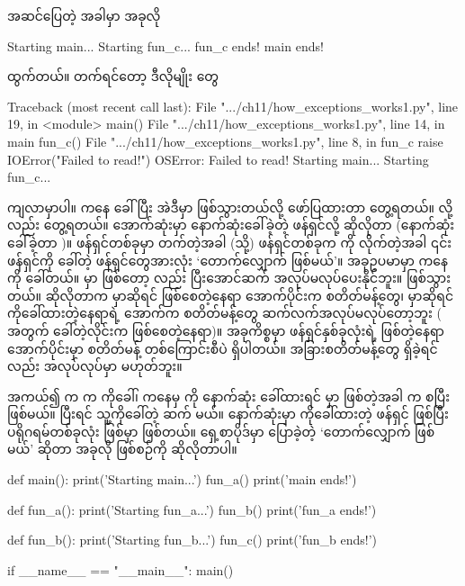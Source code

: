 အဆင်ပြေတဲ့ အခါမှာ အခုလို
\begin{codetxt}
Starting main...
Starting fun_c...
fun_c ends!
main ends!
\end{codetxt}
ထွက်တယ်။  တက်ရင်တော့ ဒီလိုမျိုး   တွေ
\begin{codetxt}
Traceback (most recent call last):
  File ".../ch11/how_exceptions_works1.py", line 19, in <module>
    main()
  File ".../ch11/how_exceptions_works1.py", line 14, in main
    fun_c()
  File ".../ch11/how_exceptions_works1.py", line 8, in fun_c
    raise IOError("Failed to read!")
OSError: Failed to read!
Starting main...
Starting fun_c...
\end{codetxt}
ကျလာမှာပါ။  ကနေ  ခေါ်ပြီး အဲဒီမှာ  ဖြစ်သွားတယ်လို့ ဖော်ပြထားတာ တွေ့ရတယ်။  လို့လည်း တွေ့ရတယ်။ အောက်ဆုံးမှာ နောက်ဆုံးခေါ်ခဲ့တဲ့ ဖန်ရှင်လို့ ဆိုလိုတာ (နောက်ဆုံး ခေါ်ခဲ့တာ )။ ဖန်ရှင်တစ်ခုမှာ  တက်တဲ့အခါ (သို့) ဖန်ရှင်တစ်ခုက  ကို  လိုက်တဲ့အခါ ၎င်းဖန်ရှင်ကို ခေါ်တဲ့ ဖန်ရှင်တွေအားလုံး ‘တောက်လျှောက်  ဖြစ်မယ်’။ အခုဥပမာမှာ  ကနေ  ကို ခေါ်တယ်။  မှာ  ဖြစ်တော့  လည်း ပြီးအောင်ဆက် အလုပ်မလုပ်ပေးနိုင်ဘူး။  ဖြစ်သွားတယ်။ ဆိုလိုတာက  မှာဆိုရင်  ဖြစ်စေတဲ့နေရာ အောက်ပိုင်းက စတိတ်မန့်တွေ၊  မှာဆိုရင်  ကိုခေါ်ထားတဲ့နေရာရဲ့ အောက်က စတိတ်မန့်တွေ ဆက်လက်အလုပ်မလုပ်တော့ဘူး ( အတွက်  ခေါ်တဲ့လိုင်းက  ဖြစ်စေတဲ့နေရာ)။  အခုကိစ္စမှာ ဖန်ရှင်နှစ်ခုလုံးရဲ့  ဖြစ်တဲ့နေရာ အောက်ပိုင်းမှာ  စတိတ်မန့် တစ်ကြောင်းစီပဲ ရှိပါတယ်။ အခြားစတိတ်မန့်တွေ ရှိခဲ့ရင်လည်း အလုပ်လုပ်မှာ မဟုတ်ဘူး။

အကယ်၍  က   က  ကိုခေါ်၊  ကနေမှ  ကို နောက်ဆုံး ခေါ်ထားရင်  မှာ  ဖြစ်တဲ့အခါ  က စပြီး  ဖြစ်မယ်။ ပြီးရင် သူ့ကိုခေါ်တဲ့  ဆက်  မယ်။ နောက်ဆုံးမှာ  ကိုခေါ်ထားတဲ့  ဖန်ရှင်  ဖြစ်ပြီး ပရိုဂရမ်တစ်ခုလုံး  ဖြစ်မှာ ဖြစ်တယ်။ ရှေ့စာပိုဒ်မှာ ပြောခဲ့တဲ့ ‘တောက်လျှောက်  ဖြစ်မယ်’ ဆိုတာ အခုလို ဖြစ်စဉ်ကို ဆိုလိုတာပါ။

%
\begin{py}
def main():
    print('Starting main...')
    fun_a()
    print('main ends!')

def fun_a():
    print('Starting fun_a...')
    fun_b()
    print('fun_a ends!')

def fun_b():
    print('Starting fun_b...')
    fun_c()
    print('fun_b ends!')

if __name__ == "__main__":
    main()
\end{py}
%

